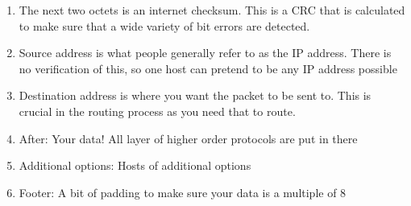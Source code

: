 \begin{enumerate}
  \item The next two octets is an internet checksum. This is a CRC that is calculated to make sure that a wide variety of bit errors are detected.
  \item Source address is what people generally refer to as the IP address. There is no verification of this, so one host can pretend to be any IP address possible
  \item Destination address is where you want the packet to be sent to. This is crucial in the routing process as you need that to route.
  \item After: Your data! All layer of higher order protocols are put in there
  \item Additional options: Hosts of additional options
  \item Footer: A bit of padding to make sure your data is a multiple of 8
\end{enumerate}

